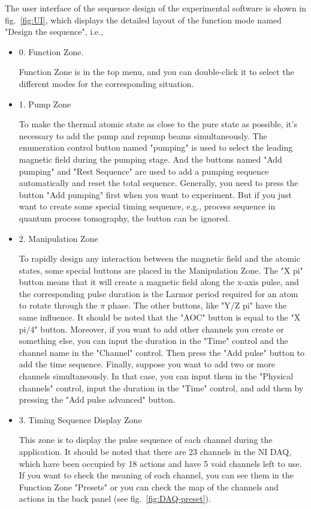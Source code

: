 \documentclass{article}
\begin{document}
The user interface of the sequence design of the experimental software is shown in fig.~\ref{fig:UI}, which displays the detailed layout of the function mode named "Design the sequence", i.e.,
\begin{itemize}
    \item 0. Function Zone. 
    
    Function Zone is in the top menu, and you can double-click it to select the different modes for the corresponding situation.
    \item 1. Pump Zone

    To make the thermal atomic state as close to the pure state as possible, it's necessary to add the pump and repump beams simultaneously. The enumeration control button named "pumping" is used to select the leading magnetic field during the pumping stage. And the buttons named "Add pumping" and "Rest Sequence" are used to add a pumping sequence automatically and reset the total sequence. Generally, you need to press the button "Add pumping" first when you want to experiment. But if you just want to create some special timing sequence, e.g., process sequence in quantum process tomography, the button can be ignored.   
    
    \item 2. Manipulation Zone

    To rapidly design any interaction between the magnetic field and the atomic states, some special buttons are placed in the Manipulation Zone. The "X pi" button means that it will create a magnetic field along the x-axis pulse, and the corresponding pulse duration is the Larmor period required for an atom to rotate through the $\pi$ phase. The other buttons, like "Y/Z pi" have the same influence. It should be noted that the "AOC" button is equal to the "X pi/4" button. Moreover, if you want to add other channels you create or something else, you can input the duration in the "Time" control and the channel name in the "Channel"  control. Then press the "Add pulse" button to add the time sequence. Finally, suppose you want to add two or more channels simultaneously. In that case, you can input them in the "Physical channels" control, input the duration in the "Time" control, and add them by pressing the "Add pulse advanced" button.  
    
    \item 3. Timing Sequence Display Zone

    This zone is to display the pulse sequence of each channel during the application. It should be noted that there are 23 channels in the NI DAQ, which have been occupied by 18 actions and have 5 void channels left to use. If you want to check the meaning of each channel, you can see them in the Function Zone "Presets" or you can check the map of the channels and actions in the back panel (see fig.~\ref{fig:DAQ-preset}).
    

\end{itemize}
\end{document}
